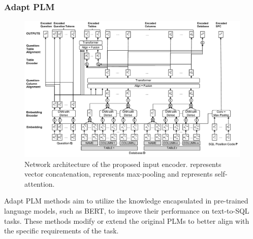 \subsubsection{Adapt PLM} %
\label{sec:adaptplm}

\begin{figure}[htbp]
    \centering
    \includegraphics[width=\textwidth]{pics/enc/fig_encode}
    \caption{Network architecture of the proposed input encoder.  represents vector concatenation,  represents max-pooling and  represents self-attention.\cite{choi_ryansql_2020}}
    \label{fig:ryan}
\end{figure}

Adapt \ac{PLM} methods aim to utilize the knowledge encapsulated in pre-trained language models, such as BERT\cite{DBLP:journals/corr/abs-1810-04805}, to improve their performance on text-to-SQL tasks. These methods modify or extend the original PLMs to better align with the specific requirements of the task.

